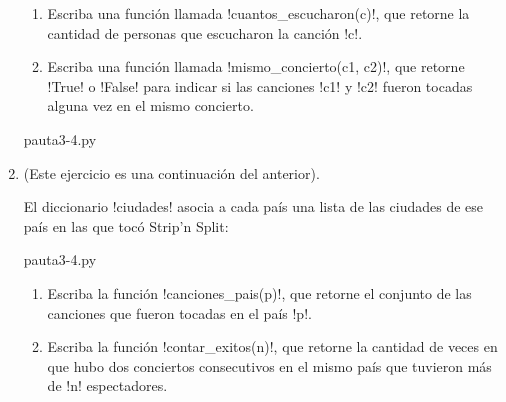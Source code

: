 \documentclass[11pt,spanish]{article}
\newcommand{\pond}[1]{[{\small\textbf{#1\%}}]}
\begin{document}
\begin{enumerate}[font=\Large\bfseries]
\begin{minipage}[t]{.45\textwidth}
        \begin{enumerate}
          \item
            Escriba una función llamada
            \li!cuantos_escucharon(c)!,
            que retorne la cantidad de personas
            que escucharon la canción \li!c!.
          \item
            Escriba una función llamada
            \li!mismo_concierto(c1, c2)!,
            que retorne \li!True! o \li!False!
            para indicar si las canciones \li!c1! y \li!c2!
            fueron tocadas alguna vez en el mismo concierto.
        \end{enumerate}
      \end{minipage}
      \hspace{2em}
      \begin{minipage}[t]{.55\textwidth}
        \small
        
           {pauta3-4.py}
      \end{minipage}

    \newpage
    \item
      \pond{25}
      (Este ejercicio es una continuación del anterior).

      El diccionario \li!ciudades!
      asocia a cada país
      una lista de las ciudades de ese país
      en las que tocó Strip'n Split:
      
         {pauta3-4.py}

      \begin{enumerate}
        \item Escriba la función \li!canciones_pais(p)!,
          que retorne el conjunto de las canciones
          que fueron tocadas en el país \li!p!.
        \item Escriba la función \li!contar_exitos(n)!,
          que retorne la cantidad de veces en que
          hubo dos conciertos consecutivos
          en el mismo país
          que tuvieron más de \li!n! espectadores.
      \end{enumerate}

  \end{enumerate}
\end{document}

